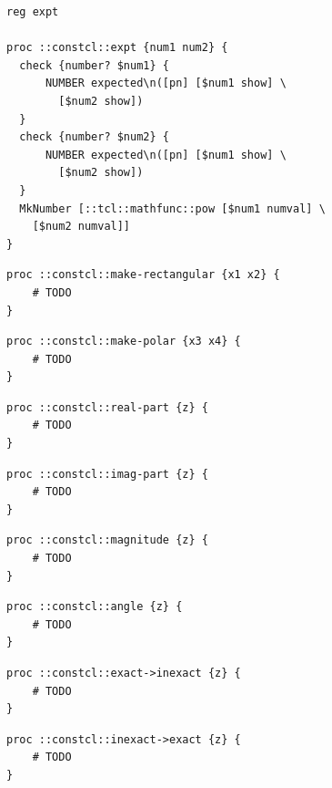 \documentclass[twoside,9pt]{report}
\begin{document}
\noindent\makebox[\linewidth]{\rule{\linewidth}{0.4pt}}
\begin{lstlisting}
reg expt
 
proc ::constcl::expt {num1 num2} {
  check {number? $num1} {
      NUMBER expected\n([pn] [$num1 show] \
        [$num2 show])
  }
  check {number? $num2} {
      NUMBER expected\n([pn] [$num1 show] \
        [$num2 show])
  }
  MkNumber [::tcl::mathfunc::pow [$num1 numval] \
    [$num2 numval]]
}
\end{lstlisting}
\noindent\makebox[\linewidth]{\rule{\linewidth}{0.4pt}}
\noindent\makebox[\linewidth]{\rule{\linewidth}{0.4pt}}
\begin{lstlisting}
proc ::constcl::make-rectangular {x1 x2} {
    # TODO
}
\end{lstlisting}
\noindent\makebox[\linewidth]{\rule{\linewidth}{0.4pt}}
\noindent\makebox[\linewidth]{\rule{\linewidth}{0.4pt}}
\begin{lstlisting}
proc ::constcl::make-polar {x3 x4} {
    # TODO
}
\end{lstlisting}
\noindent\makebox[\linewidth]{\rule{\linewidth}{0.4pt}}
\noindent\makebox[\linewidth]{\rule{\linewidth}{0.4pt}}
\begin{lstlisting}
proc ::constcl::real-part {z} {
    # TODO
}
\end{lstlisting}
\noindent\makebox[\linewidth]{\rule{\linewidth}{0.4pt}}
\noindent\makebox[\linewidth]{\rule{\linewidth}{0.4pt}}
\begin{lstlisting}
proc ::constcl::imag-part {z} {
    # TODO
}
\end{lstlisting}
\noindent\makebox[\linewidth]{\rule{\linewidth}{0.4pt}}
\noindent\makebox[\linewidth]{\rule{\linewidth}{0.4pt}}
\begin{lstlisting}
proc ::constcl::magnitude {z} {
    # TODO
}
\end{lstlisting}
\noindent\makebox[\linewidth]{\rule{\linewidth}{0.4pt}}
\noindent\makebox[\linewidth]{\rule{\linewidth}{0.4pt}}
\begin{lstlisting}
proc ::constcl::angle {z} {
    # TODO
}
\end{lstlisting}
\noindent\makebox[\linewidth]{\rule{\linewidth}{0.4pt}}
\noindent\makebox[\linewidth]{\rule{\linewidth}{0.4pt}}
\begin{lstlisting}
proc ::constcl::exact->inexact {z} {
    # TODO
}
\end{lstlisting}
\noindent\makebox[\linewidth]{\rule{\linewidth}{0.4pt}}
\noindent\makebox[\linewidth]{\rule{\linewidth}{0.4pt}}
\begin{lstlisting}
proc ::constcl::inexact->exact {z} {
    # TODO
}
\end{lstlisting}
\noindent\makebox[\linewidth]{\rule{\linewidth}{0.4pt}}
\end{document}

